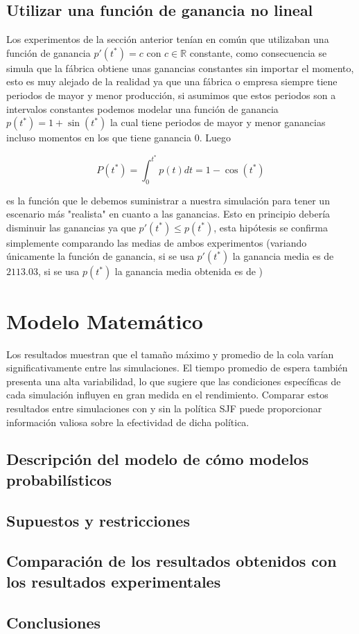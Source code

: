 \documentclass[10pt,twocolumn]{article}
\begin{document}
\subsection{Utilizar una función de ganancia no lineal}

Los experimentos de la sección anterior tenían en común que utilizaban una función de ganancia $p\prime(t^{*}) = c$ con $c \in \mathbb{R}$ constante, como consecuencia se simula que la fábrica obtiene unas ganancias constantes sin importar el momento, esto es muy alejado de la realidad ya que una fábrica o empresa siempre tiene periodos de mayor y menor producción, si asumimos que estos periodos son a intervalos constantes podemos modelar una función de ganancia $p(t^{*}) = 1 + \sin(t^{*})$ la cual tiene periodos de mayor y menor ganancias incluso momentos en los que tiene ganancia $0$. Luego 

$$
P(t^{*}) = \int_{0}^{t^{*}} {p(t)dt} = 1 - \cos(t^{*})
$$

es la función que le debemos suministrar a nuestra simulación para tener un escenario más "realista" en cuanto a las ganancias. Esto en principio debería disminuir las ganancias ya que $p\prime(t^{*}) \leq p(t^{*})$, esta hipótesis se confirma simplemente comparando las medias de ambos experimentos (variando únicamente la función de ganancia, si se usa $p\prime(t^{*})$ la ganancia media es de $2113.03$, si se usa $p(t^{*})$ la ganancia media obtenida es de )



\section{Modelo Matemático}
Los resultados muestran que el tamaño máximo y promedio de la cola varían significativamente entre las simulaciones. El tiempo promedio de espera también presenta una alta variabilidad, lo que sugiere que las condiciones específicas de cada simulación influyen en gran medida en el rendimiento. Comparar estos resultados entre simulaciones con y sin la política SJF puede proporcionar información valiosa sobre la efectividad de dicha política.
\subsection{Descripción del modelo de cómo modelos probabilísticos}
\subsection{Supuestos y restricciones}
\subsection{Comparación de los resultados obtenidos con los resultados experimentales}

\subsection{Conclusiones}
\end{document}
